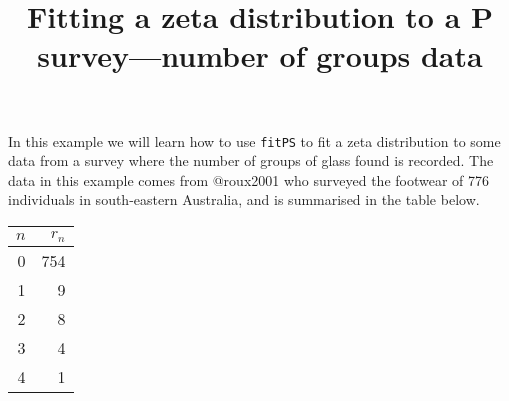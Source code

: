 \documentclass{article}\usepackage[]{graphicx}\usepackage[]{xcolor}
\title{Fitting a zeta distribution to a {P} survey---number of groups data}
\newcommand{\rcode}[1]{\lstinline[language=R,basicstyle=\normalsize\ttfamily]!#1!}
\begin{document}
In this example we will learn how to use \rcode{fitPS} to fit a zeta distribution to some data from a survey where the number of groups of glass found is recorded. The data in this example comes from @roux2001 who surveyed the footwear of 776 individuals in south-eastern Australia, and is summarised in the table below.
\begin{table}[ht]
\centering
\begin{tabular}{rr}
  \hline
$n$ & $r_n$ \\ 
  \hline
0 & 754 \\ 
  1 & 9 \\ 
  2 & 8 \\ 
  3 & 4 \\ 
  4 & 1 \\ 
   \hline
\end{tabular}
\end{table}
\end{document}
